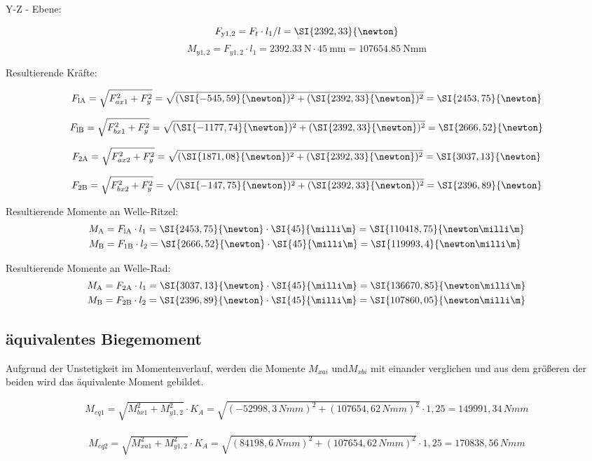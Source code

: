   		 Y-Z - Ebene:
  		 
		$$F_{\rm y 1,2} = F_t \cdot l_1/l = \SI{2392,33}{\newton}$$
		$$M_{y1,2}= F_{y1,2} \cdot l_1= \SI{2392,33}{\newton} \cdot \SI{45}{\milli\m}=\SI{107654,85}{ \newton \milli\meter}$$
		\vspace{0.5cm}
		
		
		Resultierende Kräfte:
		
		$$F_{\rm lA}= \sqrt{F_{ax1}^2+F_y^2}=\sqrt{(\SI{-545,59}{\newton})^2 + (\SI{2392,33}{\newton})^2} = \SI{2453,75}{\newton}$$
		
		$$F_{\rm lB}= \sqrt{F_{bx1}^2+F_y^2}= \sqrt{(\SI{-1177,74}{\newton})^2+ (\SI{2392,33}{\newton})^2}= \SI{2666,52}{\newton}$$
		
		$$F_{\rm 2A}= \sqrt{F_{ax2}^2+F_y^2}= \sqrt{(\SI{1871,08}{\newton})^2 + (\SI{2392,33}{\newton})^2} = \SI{3037,13}{\newton}$$
		
		$$F_{\rm 2B}= \sqrt{F_{bx2}^2+F_y^2}= \sqrt{(\SI{-147,75}{\newton})^2 + (\SI{2392,33}{\newton})^2} = \SI{2396,89}{\newton} $$
		\vspace{0.5cm}
		
		
		Resultierende Momente an Welle-Ritzel:
		\begin{align*}
		M_{\rm A} &= F_{\rm lA} \cdot l_1  = \SI{2453,75}{\newton}\cdot \SI{45}{\milli\m} = \SI{110418,75}{\newton\milli\m}\\
		M_{\rm B} &= F_{\rm 1B} \cdot l_2  = \SI{2666,52}{\newton}\cdot \SI{45}{\milli\m} = \SI{119993,4}{\newton\milli\m}\\
		\end{align*}
		
		Resultierende Momente an Welle-Rad:
		\begin{align*}
		M_{\rm A} &= F_{\rm 2A} \cdot l_1  = \SI{3037,13}{\newton}\cdot \SI{45}{\milli\m} = \SI{136670,85}{\newton\milli\m}\\
		M_{\rm B} &= F_{\rm 2B} \cdot l_2  = \SI{2396,89}{\newton}\cdot \SI{45}{\milli\m} = \SI{107860,05}{\newton\milli\m}
		\end{align*}
		
		\subsection{äquivalentes Biegemoment}
		     Aufgrund der Unstetigkeit im Momentenverlauf, werden die Momente $M_{xai}$ und$M_{xbi}$ mit einander verglichen und aus dem größeren der beiden wird das äquivalente Moment gebildet. 
		
		\begin{align*}
		M_{eq1}=\sqrt{M_{bx1}^{2}+M_{y1,2}^{2}} \cdot K_{A}=\sqrt{(-52998,3\,Nmm)^{2} + (107654,62\,Nmm)^{2}} \cdot 1,25=149991,34\,Nmm
		\end{align*}
		
		\begin{align*}
		M_{eq2}=\sqrt{M_{xa1}^{2}+M_{y1,2}^{2}} \cdot K_{A} =\sqrt{(84198,6\,Nmm)^{2}+(107654,62\,Nmm)^{2}}\cdot 1,25=170838,56\,Nmm
		\end{align*}
